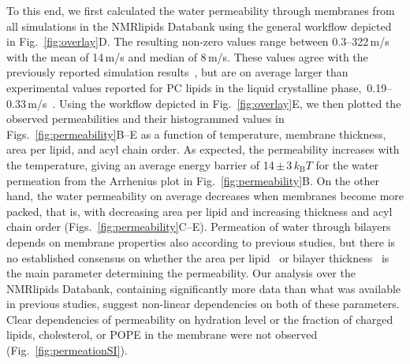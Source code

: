 \documentclass[fleqn,10pt]{wlscirep}
\begin{document}
To this end, we first calculated the water permeability through membranes from all simulations in the NMRlipids Databank using the general workflow depicted in Fig.~\ref{fig:overlay}D. The resulting non-zero values range between 0.3--322\,\textmu{}m/s with the mean of 14\,\textmu{}m/s and median of 8\,\textmu{}m/s. These values agree with the previously reported simulation results~\cite{venable19,camilo2022}, but are on average larger than experimental values reported for PC lipids in the liquid crystalline phase,~0.19--0.33\,\textmu{}m/s~\cite{jansen95}. Using the workflow depicted in Fig.~\ref{fig:overlay}E, we then plotted the observed permeabilities and their histogrammed values in Figs.~\ref{fig:permeability}B--E as a function of temperature, membrane thickness, area per lipid, and acyl chain order. As expected, the permeability increases with the temperature, giving an average energy barrier of 14\,$\pm$\,3\,$k_\mathrm{B}T$ for the water permeation from the Arrhenius plot in Fig.~\ref{fig:permeability}B. On the other hand, the water permeability on average decreases when membranes become more packed, that is, with decreasing area per lipid and increasing thickness and acyl chain order (Figs.~\ref{fig:permeability}C--E). Permeation of water through bilayers depends on membrane properties also according to previous studies, but there is no established consensus on whether the area per lipid~\cite{nagle08} or bilayer thickness~\cite{frallicciardi22} is the main parameter determining the permeability. 
Our analysis over the NMRlipids Databank, containing significantly more data than what was available in previous studies, suggest non-linear dependencies on both of these parameters.
Clear dependencies of permeability on hydration level or the fraction of charged lipids, cholesterol, or POPE in the membrane were not observed (Fig.~\ref{fig:permeationSI}).
%
\end{document}
